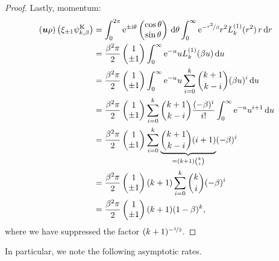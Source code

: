 \begin{proof}
Lastly, momentum:
\begin{align*}
({\bm u}\rho)\left(\xi_{\pm1}\psi^{\mathrm{K}}_{k,\beta}\right)
&= \int_0^{2\pi} \mathrm{e}^{\pm\mathrm{i}\theta} \begin{pmatrix} \cos\theta \\ \sin\theta \end{pmatrix} \,\mathrm{d}\theta
   \int_0^\infty \mathrm{e}^{-\nicefrac{r^2}{\beta}} r^2 L_k^{(1)}(r^2) \, r \,\mathrm{d} r \\
&= \frac{\beta^2\pi}{2}\begin{pmatrix}1\\\pm1\end{pmatrix}
   \int_0^\infty \mathrm{e}^{-u} u L_k^{(1)}(\beta u) \,\mathrm{d} u \\
&= \frac{\beta^2\pi}{2}\begin{pmatrix}1\\\pm1\end{pmatrix}
   \int_0^\infty \mathrm{e}^{-u} u \sum_{i=0}^k \binom{k+1}{k-i} (\beta u)^i \,\mathrm{d} u \\
&= \frac{\beta^2\pi}{2}\begin{pmatrix}1\\\pm1\end{pmatrix}
   \sum_{i=0}^k \binom{k+1}{k-i} \frac{(-\beta)^i}{i!} \int_0^\infty \mathrm{e}^{-u} u^{i+1} \,\mathrm{d} u \\
&= \frac{\beta^2\pi}{2}\begin{pmatrix}1\\\pm1\end{pmatrix}
   \sum_{i=0}^k \underbrace{\binom{k+1}{k-i}(i+1)}_{=(k+1)\binom{k}{i}} (-\beta)^i \\
&= \frac{\beta^2\pi}{2}\begin{pmatrix}1\\\pm1\end{pmatrix} (k+1) \sum_{i=0}^k \binom{k}{i} (-\beta)^i \\
&= \frac{\beta^2\pi}{2}\begin{pmatrix}1\\\pm1\end{pmatrix} (k+1)(1-\beta)^k,
\end{align*}
where we have suppressed the factor $(k+1)^{-\nicefrac{1}{2}}$.
\end{proof}
In particular, we note the following asymptotic rates.
